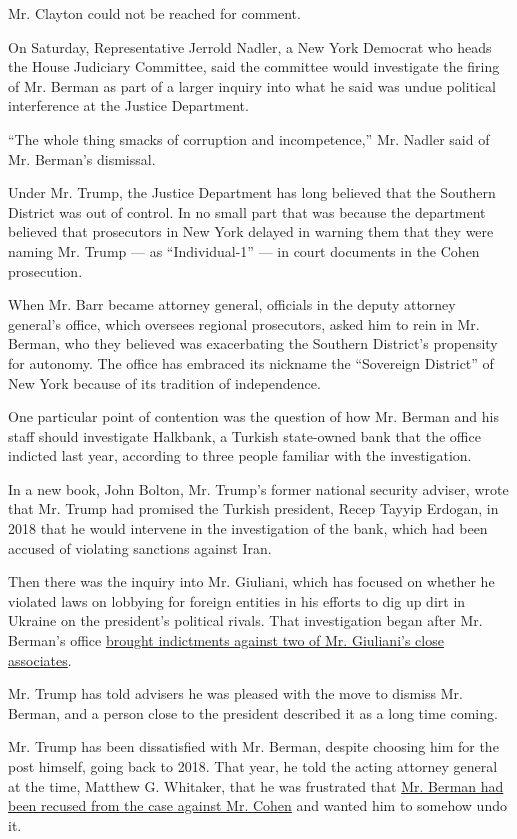 Mr. Clayton could not be reached for comment.

On Saturday, Representative Jerrold Nadler, a New York Democrat who
heads the House Judiciary Committee, said the committee would
investigate the firing of Mr. Berman as part of a larger inquiry into
what he said was undue political interference at the Justice Department.

``The whole thing smacks of corruption and incompetence,'' Mr. Nadler
said of Mr. Berman's dismissal.

Under Mr. Trump, the Justice Department has long believed that the
Southern District was out of control. In no small part that was because
the department believed that prosecutors in New York delayed in warning
them that they were naming Mr. Trump --- as ``Individual-1'' --- in
court documents in the Cohen prosecution.

When Mr. Barr became attorney general, officials in the deputy attorney
general's office, which oversees regional prosecutors, asked him to rein
in Mr. Berman, who they believed was exacerbating the Southern
District's propensity for autonomy. The office has embraced its nickname
the ``Sovereign District'' of New York because of its tradition of
independence.

One particular point of contention was the question of how Mr. Berman
and his staff should investigate Halkbank, a Turkish state-owned bank
that the office indicted last year, according to three people familiar
with the investigation.

In a new book, John Bolton, Mr. Trump's former national security
adviser, wrote that Mr. Trump had promised the Turkish president, Recep
Tayyip Erdogan, in 2018 that he would intervene in the investigation of
the bank, which had been accused of violating sanctions against Iran.

Then there was the inquiry into Mr. Giuliani, which has focused on
whether he violated laws on lobbying for foreign entities in his efforts
to dig up dirt in Ukraine on the president's political rivals. That
investigation began after Mr. Berman's office
\href{https://www.nytimes.com/2019/10/10/us/politics/lev-parnas-igor-fruman-arrested-giuliani.html}{brought
indictments against two of Mr. Giuliani's close associates}.

Mr. Trump has told advisers he was pleased with the move to dismiss Mr.
Berman, and a person close to the president described it as a long time
coming.

Mr. Trump has been dissatisfied with Mr. Berman, despite choosing him
for the post himself, going back to 2018. That year, he told the acting
attorney general at the time, Matthew G. Whitaker, that he was
frustrated that
\href{https://www.nytimes.com/2019/02/19/us/politics/trump-investigations.html}{Mr.
Berman had been recused from the case against Mr. Cohen} and wanted him
to somehow undo it.

